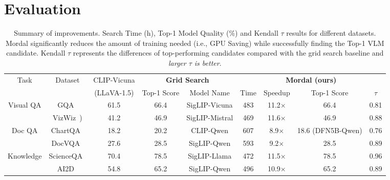 \section{Evaluation}
\label{sec:eval}



\begingroup
\renewcommand{\arraystretch}{1.2}
\begin{table*}[!ht]
\centering
\caption{Summary of improvements. Search Time (h), Top-1 Model Quality (\%) and Kendall $\tau$ results for different datasets. Mordal significantly reduces the amount of training needed (i.e., GPU Saving) while successfully finding the Top-1 VLM candidate. Kendall $\tau$ represents the differences of top-performing candidates compared with the grid search baseline and \textit{larger $\tau$ is better}.}
\label{table:eval_perf}
\scriptsize
\begin{tabular}{cc|c||cc|cccc}

\toprule 
\multirow{2}{*}{Task}
& \multirow{2}{*}{Dataset} 
& CLIP-Vicuna
& \multicolumn{2}{c|}{\textbf{Grid Search}}
& \multicolumn{4}{c}{\textbf{Mordal (ours)}}
\\
&   & (LLaVA-1.5) 
& Top-1 Score & Model Name & Time & Speedup & Top-1 Score & $\tau$ 
\\

\hline
 \multirow{2}{*}{Visual QA} 
    & GQA~\cite{hudson2019gqa}       
    & 61.5  
    & 66.4   & SigLIP-Vicuna & 483 & 11.2$\times$ & 66.4  & 0.81 \\
\cline{2-9}
    & VizWiz~\cite{gurari2018vizwiz})    
    & 41.2  
    & 46.9   & SigLIP-Mistral & 469 & 11.6$\times$ & 46.9 & 0.88 \\
\hline

 \multirow{2}{*}{Doc QA} 
    & ChartQA~\cite{masry2022chartqa}  
    & 18.2  
    & 20.2  & CLIP-Qwen & 607 & 8.9$\times$ & 18.6 (DFN5B-Qwen)  & 0.76 \\
\cline{2-9}
    & DocVQA~\cite{mathew2021docvqa}    
    & 27.6  
    & 28.5  & SigLIP-Qwen & 593 & 9.2$\times$ & 28.5  & 0.89 \\
\hline

 \multirow{2}{*}{Knowledge} 
    & ScienceQA~\cite{lu2022learn}     
    & 70.4  
    & 78.5  & SigLIP-Llama & 472 & 11.5$\times$ & 78.5  & 0.96 \\
\cline{2-9}
    & AI2D~\cite{kembhavi2016diagram}          
    & 54.8  
    & 65.2  & SigLIP-Qwen & 496 & 10.9$\times$ & 65.2  & 0.89 \\
\bottomrule
\end{tabular}
\vspace{-8mm}
\end{table*}%
\endgroup

